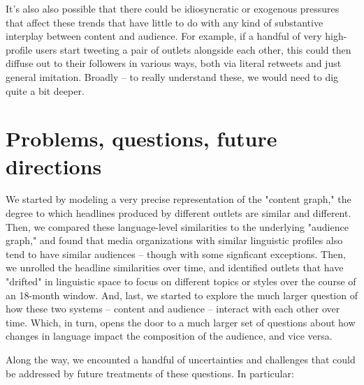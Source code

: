 \documentclass{scrartcl}
\begin{document}
It's also also possible that there could be idiosyncratic or exogenous pressures that affect these trends that have little to do with any kind of substantive interplay between content and audience. For example, if a handful of very high-profile users start tweeting a pair of outlets alongside each other, this could then diffuse out to their followers in various ways, both via literal retweets and just general imitation. Broadly -- to really understand these, we would need to dig quite a bit deeper.

\section{Problems, questions, future directions}

We started by modeling a very precise representation of the "content graph," the degree to which headlines produced by different outlets are similar and different. Then, we compared these language-level similarities to the underlying "audience graph," and found that media organizations with similar linguistic profiles also tend to have similar audiences -- though with some signficant exceptions. Then, we unrolled the headline similarities over time, and identified outlets that have "drifted" in linguistic space to focus on different topics or styles over the course of an 18-month window. And, last, we started to explore the much larger question of how these two systems -- content and audience -- interact with each other over time. Which, in turn, opens the door to a much larger set of questions about how changes in language impact the composition of the audience, and vice versa.

Along the way, we encounted a handful of uncertainties and challenges that could be addressed by future treatments of these questions. In particular:
\end{document}
